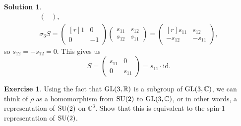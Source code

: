 \documentclass[11pt, a4paper]{report}
\theoremstyle{definition}
\newtheorem{ex}{Exercise}[part]
\newtheorem{sol}{Solution}[part]
\newcommand*{\GL}{\ensuremath\text{GL}}
\newcommand*{\SU}{\ensuremath\text{SU}}
\begin{document}
\begin{sol}
\begin{gather*}
\begin{pmatrix}
        \end{pmatrix}, \\
    \sigma_3 S =
        \begin{pmatrix*}[r]
            1 &  0 \\
            0 & -1
        \end{pmatrix*}
        \begin{pmatrix}
            s_{11} & s_{12} \\
            s_{12} & s_{11}
        \end{pmatrix}
        =
        \begin{pmatrix*}[r]
            s_{11}  & s_{12} \\
            -s_{12} & -s_{11}
        \end{pmatrix*},
\end{gather*}
so $s_{12} = -s_{12} = 0$. This gives us
\[
    S = \begin{pmatrix}
            s_{11} & 0 \\
            0      & s_{11}
        \end{pmatrix}
        = s_{11} \cdot \text{id}.
\]

\end{sol}

\begin{ex}

Using the fact that $\GL(3, \mathbb{R})$ is a subgroup of $\GL(3, \mathbb{C})$, we can think of $\rho$ as a homomorphism from $\SU(2)$ to $\GL(3, \mathbb{C})$, or in other words, a representation of $\SU(2)$ on $\mathbb{C}^3$.
Show that this is equivalent to the spin-1 representation of $\SU(2)$.

\end{ex}
\end{document}
